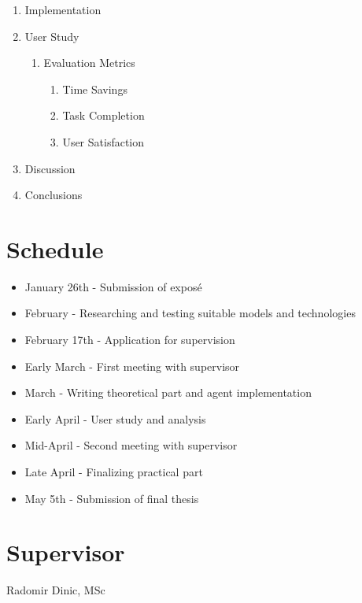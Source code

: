 \documentclass[12pt,a4paper]{article}
\begin{document}
\begin{enumerate}
	\item Implementation
	\item User Study
	      \begin{enumerate}
		      \item Evaluation Metrics
		            \begin{enumerate}
			            \item Time Savings
			            \item Task Completion
			            \item User Satisfaction
		            \end{enumerate}
	      \end{enumerate}
	\item Discussion
	\item Conclusions
\end{enumerate}

\nocite{*}
\printbibliography

\section*{Schedule}

\begin{itemize}
	\item January 26th - Submission of exposé
	\item February - Researching and testing suitable models and technologies
	\item February 17th - Application for supervision
	\item Early March - First meeting with supervisor
	\item March - Writing theoretical part and agent implementation
	\item Early April - User study and analysis
	\item Mid-April - Second meeting with supervisor
	\item Late April - Finalizing practical part
	\item May 5th - Submission of final thesis
\end{itemize}

\section*{Supervisor}
Radomir Dinic, MSc
\end{document}
